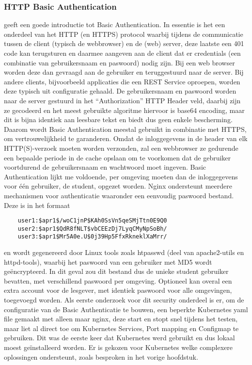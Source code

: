 \subsubsection{HTTP Basic Authentication}
\textcite{Mozilla2023} geeft een goede introductie tot Basic Authentication.
In essentie is het een onderdeel van het HTTP (en HTTPS) protocol waarbij tijdens de communicatie tussen de client (typisch de webbrowser) en de (web) server, deze laatste een 401 code kan terugsturen en daarmee aangeven aan de client dat er credentials (een combinatie van gebruikersnaam en paswoord) nodig zijn. Bij een web browser worden deze dan gevraagd aan de gebruiker en teruggestuurd naar de server. Bij andere clients, bijvoorbeeld applicaties die een REST Service oproepen, worden deze typisch uit configuratie gehaald.
De gebruikersnaam en paswoord worden naar de server gestuurd in het ``Authorization'' HTTP Header veld, daarbij zijn ze gecodeerd en het meest gebruikte algoritme hiervoor is base64 encoding, maar dit is bijna identiek aan leesbare tekst en biedt dus geen enkele bescherming. Daarom wordt Basic Authentication meestal gebruikt in combinatie met HTTPS, om vertrouwelijkheid te garanderen.
\newline
Omdat de inloggegevens in de header van elk HTTP(S)-verzoek moeten worden verzonden, zal een webbrowser ze gedurende een bepaalde periode in de cache opslaan om te voorkomen dat de gebruiker voortdurend de gebruikersnaam en wachtwoord moet ingeven.
\newline
\newline
Basic Authentication lijkt me voldoende, per omgeving moeten dan de inloggegevens voor \'e\'en gebruiker, de student, opgezet worden. Nginx ondersteunt meerdere mechanismen voor authenticatie waaronder een eenvoudig paswoord bestand. Deze is in het formaat

\begin{lstlisting}
    user1:$apr1$/woC1jnP$KAh0SsVn5qeSMjTtn0E9Q0
    user2:$apr1$QdR8fNLT$vbCEEzDj7LyqCMyNpSoBh/
    user3:$apr1$Mr5A0e.U$0j39Hp5FfxRkneklXaMrr/ 
\end{lstlisting}


en wordt gegenereerd door Linux tools zoals htpasswd (deel van apache2-utils en httpd-tools), waarbij het paswoord van een gebruiker met MD5 wordt geëncrypteerd. In dit geval zou dit bestand dus de unieke student gebruiker bevatten, met verschillend paswoord per omgeving.
Optioneel kan overal een extra account voor de lesgever, met identiek paswoord voor alle omgevingen, toegevoegd worden.
\newline
\newline
Als eerste onderzoek voor dit security onderdeel is er, om de configuratie van de Basic Authenticatie te bouwen, een beperkte Kubernetes yaml file gemaakt met alleen maar nginx, deze start en stopt snel tijdens het testen, maar liet al direct toe om Kubernetes Services, Port mapping en Configmap te gebruiken. Dit was de eerste keer dat Kubernetes werd gebruikt en dus lokaal moest geïnstalleerd worden.
\newline
Er is gekozen voor Kubernetes welke complexere oplossingen ondersteunt, zoals besproken in het vorige hoofdstuk.
\newline
\newline
